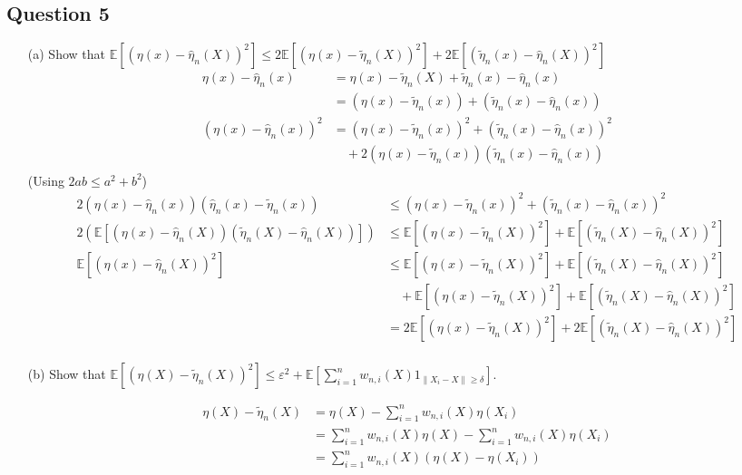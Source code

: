 \documentclass[12pt]{article}
\begin{document}
\subsection*{Question 5}
\begin{enumerate}
\item[(a)]
Show that $\mathbb{E}[(\eta(x) - \hat{\eta}_n(X))^2] \leq 2\mathbb{E}[(\eta(x) - \tilde{\eta}_n(X))^2] + 2\mathbb{E}[(\tilde{\eta}_n(x) - \hat{\eta}_n(X))^2]$ 
\begin{align*}
	\eta(x) - \hat{\eta}_n(x) &= \eta(x) - \tilde{\eta}_n(X) + \tilde{\eta}_n(x) - \hat{\eta}_n(x)\\
	 &= (\eta(x) - \tilde{\eta}_n(x)) + (\tilde{\eta}_n(x) - \hat{\eta}_n(x))\\
	 (\eta(x) - \hat{\eta}_n(x))^2 &= (\eta(x) - \tilde{\eta}_n(x))^2 + (\tilde{\eta}_n(x) - \hat{\eta}_n(x))^2 \\
	 &\quad + 2(\eta(x) - \tilde{\eta}_n(x))(\tilde{\eta}_n(x) - \hat{\eta}_n(x))\\
\end{align*}
(Using $2ab \leq a^2 + b^2$)
\begin{align*}
	 2(\eta(x) - \hat{\eta}_n(x))(\hat{\eta}_n(x) - \tilde{\eta}_n(x)) &\leq (\eta(x) - \tilde{\eta}_n(x))^2 + (\tilde{\eta}_n(x) - \hat{\eta}_n(x))^2 \\
	 2(\mathbb{E}[(\eta(x) - \hat{\eta}_n(X))(\tilde{\eta}_n(X) - \hat{\eta}_n(X))]) &\leq \mathbb{E}[(\eta(x) - \tilde{\eta}_n(X))^2] + \mathbb{E}[(\tilde{\eta}_n(X) - \hat{\eta}_n(X))^2]\\
	 \mathbb{E}[(\eta(x) - \hat{\eta}_n(X))^2] &\leq \mathbb{E}[(\eta(x) - \tilde{\eta}_n(X))^2] + \mathbb{E}[(\tilde{\eta}_n(X) - \hat{\eta}_n(X))^2]\\
	 &\quad+ \mathbb{E}[(\eta(x) - \tilde{\eta}_n(X))^2] + \mathbb{E}[(\tilde{\eta}_n(X) - \hat{\eta}_n(X))^2]\\
	 &= 2\mathbb{E}[(\eta(x) - \tilde{\eta}_n(X))^2] + 2\mathbb{E}[(\tilde{\eta}_n(X) - \hat{\eta}_n(X))^2]\\
	\end{align*}
\item[(b)] Show that $\mathbb{E}[(\eta(X) - \tilde{\eta}_n(X))^2] \leq \varepsilon^2 + \mathbb{E}\left[\sum_{i=1}^{n} w_{n,i}(X)1_{\|X_i - X\| \geq \delta}\right]$.

\begin{align*}
\eta(X) - \tilde{\eta}_n(X) &= \eta(X) - \sum_{i=1}^n w_{n,i}(X) \eta(X_i)\\
&= \sum_{i=1}^n w_{n,i}(X) \eta(X) - \sum_{i=1}^n w_{n,i}(X) \eta(X_i)\\
&= \sum_{i=1}^n w_{n,i}(X)(\eta(X) - \eta(X_i))
\end{align*}


\end{enumerate}
\end{document}
